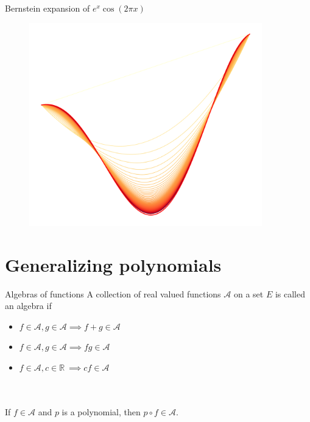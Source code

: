 \documentclass{beamer}
\def\R{\mathbb{R}}
\begin{document}
    \begin{frame}{Bernstein expansion of $e^x\cos(2\pi x)$}
        \begin{figure}
            \centering
            \includegraphics[width=0.9\textwidth]{./img/expansions.png}
            \label{fig:bernstein_expansion}
        \end{figure}
    \end{frame}

    \section{Generalizing polynomials}
    
    \begin{frame}{Algebras of functions}
        A collection of real valued functions $\mathscr{A}$ on a set $E$ is called an
        algebra if
        \begin{itemize}
            \item $f \in \mathscr{A}, g \in \mathscr{A} \implies f + g \in \mathscr{A}$
            \item $f \in \mathscr{A}, g \in \mathscr{A} \implies fg \in \mathscr{A}$
            \item $f \in \mathscr{A}, c \in \R \:\implies cf \in \mathscr{A}$
        \end{itemize}

        \\~\\

        If $f \in \mathscr{A}$ and $p$ is a polynomial, then $p\circ f \in
        \mathscr{A}$.
    \end{frame}
\end{document}

